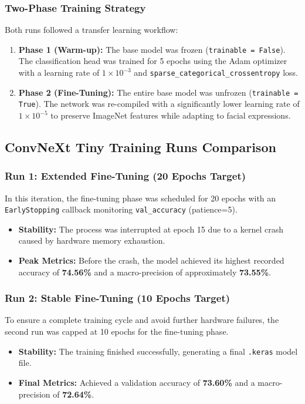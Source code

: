 \documentclass{article}
\begin{document}
\subsubsection{Two-Phase Training Strategy}
Both runs followed a transfer learning workflow:
\begin{enumerate}
    \item \textbf{Phase 1 (Warm-up):} The base model was frozen (\texttt{trainable = False}). The classification head was trained for 5 epochs using the Adam optimizer with a learning rate of $1 \times 10^{-3}$ and \texttt{sparse\_categorical\_crossentropy} loss.
    \item \textbf{Phase 2 (Fine-Tuning):} The entire base model was unfrozen (\texttt{trainable = True}). The network was re-compiled with a significantly lower learning rate of $1 \times 10^{-5}$ to preserve ImageNet features while adapting to facial expressions.
\end{enumerate}

\subsection{ConvNeXt Tiny Training Runs Comparison}

\subsubsection{Run 1: Extended Fine-Tuning (20 Epochs Target)}
In this iteration, the fine-tuning phase was scheduled for 20 epochs with an \texttt{EarlyStopping} callback monitoring \texttt{val\_accuracy} (patience=5).
\begin{itemize}
    \item \textbf{Stability:} The process was interrupted at epoch 15 due to a kernel crash caused by hardware memory exhaustion.
    \item \textbf{Peak Metrics:} Before the crash, the model achieved its highest recorded accuracy of \textbf{74.56\%} and a macro-precision of approximately \textbf{73.55\%}.
\end{itemize}

\subsubsection{Run 2: Stable Fine-Tuning (10 Epochs Target)}
To ensure a complete training cycle and avoid further hardware failures, the second run was capped at 10 epochs for the fine-tuning phase.
\begin{itemize}
    \item \textbf{Stability:} The training finished successfully, generating a final \texttt{.keras} model file.
    \item \textbf{Final Metrics:} Achieved a validation accuracy of \textbf{73.60\%} and a macro-precision of \textbf{72.64\%}.
\end{itemize}
\end{document}
